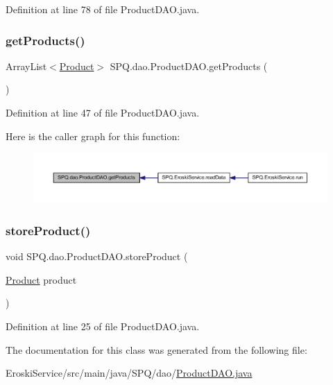 Definition at line 78 of file Product\+D\+A\+O.\+java.

\mbox{\label{class_s_p_q_1_1dao_1_1_product_d_a_o_addd0016628e2b0db06969de5a944eace}} 
\subsubsection{\texorpdfstring{get\+Products()}{getProducts()}}
{\footnotesize\ttfamily Array\+List$<$\mbox{\hyperlink{class_s_p_q_1_1data_1_1_product}{Product}}$>$ S\+P\+Q.\+dao.\+Product\+D\+A\+O.\+get\+Products (\begin{DoxyParamCaption}{ }\end{DoxyParamCaption})}



Definition at line 47 of file Product\+D\+A\+O.\+java.

Here is the caller graph for this function\+:\nopagebreak
\begin{figure}[H]
\begin{center}
\leavevmode
\includegraphics[width=350pt]{class_s_p_q_1_1dao_1_1_product_d_a_o_addd0016628e2b0db06969de5a944eace_icgraph}
\end{center}
\end{figure}
\mbox{\label{class_s_p_q_1_1dao_1_1_product_d_a_o_ae890d625011f3c28730259820c9f4f3c}} 
\subsubsection{\texorpdfstring{store\+Product()}{storeProduct()}}
{\footnotesize\ttfamily void S\+P\+Q.\+dao.\+Product\+D\+A\+O.\+store\+Product (\begin{DoxyParamCaption}\item[{\mbox{\hyperlink{class_s_p_q_1_1data_1_1_product}{Product}}}]{product }\end{DoxyParamCaption})}



Definition at line 25 of file Product\+D\+A\+O.\+java.



The documentation for this class was generated from the following file\+:\begin{DoxyCompactItemize}
\item 
Eroski\+Service/src/main/java/\+S\+P\+Q/dao/\mbox{\hyperlink{_product_d_a_o_8java}{Product\+D\+A\+O.\+java}}\end{DoxyCompactItemize}
